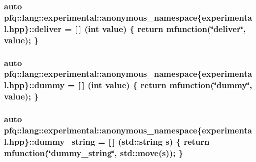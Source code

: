 \hypertarget{namespacepfq_1_1lang_1_1experimental_1_1anonymous__namespace_02experimental_8hpp_03_aabd600ebf1ee62184fa0765f49f9f990}{
\subsubsection[{deliver}]{\setlength{\rightskip}{0pt plus 5cm}auto pfq\+::lang\+::experimental\+::anonymous\+\_\+namespace\{experimental.\+hpp\}\+::deliver = \mbox{[}$\,$\mbox{]} (int value) \{ return {\bf mfunction}(\char`\"{}deliver\char`\"{}, value); \}}}\label{namespacepfq_1_1lang_1_1experimental_1_1anonymous__namespace_02experimental_8hpp_03_aabd600ebf1ee62184fa0765f49f9f990}
\hypertarget{namespacepfq_1_1lang_1_1experimental_1_1anonymous__namespace_02experimental_8hpp_03_a5fc8274e9598b8524f833264174b62b7}{
\subsubsection[{dummy}]{\setlength{\rightskip}{0pt plus 5cm}auto pfq\+::lang\+::experimental\+::anonymous\+\_\+namespace\{experimental.\+hpp\}\+::dummy = \mbox{[}$\,$\mbox{]} (int value) \{ return {\bf mfunction}(\char`\"{}dummy\char`\"{}, value); \}}}\label{namespacepfq_1_1lang_1_1experimental_1_1anonymous__namespace_02experimental_8hpp_03_a5fc8274e9598b8524f833264174b62b7}
\hypertarget{namespacepfq_1_1lang_1_1experimental_1_1anonymous__namespace_02experimental_8hpp_03_a354cb0bfb9d9033e9d87f03fba7c7267}{
\subsubsection[{dummy\+\_\+string}]{\setlength{\rightskip}{0pt plus 5cm}auto pfq\+::lang\+::experimental\+::anonymous\+\_\+namespace\{experimental.\+hpp\}\+::dummy\+\_\+string = \mbox{[}$\,$\mbox{]} (std\+::string s) \{ return {\bf mfunction}(\char`\"{}dummy\+\_\+string\char`\"{}, std\+::move(s)); \}}}\label{namespacepfq_1_1lang_1_1experimental_1_1anonymous__namespace_02experimental_8hpp_03_a354cb0bfb9d9033e9d87f03fba7c7267}
